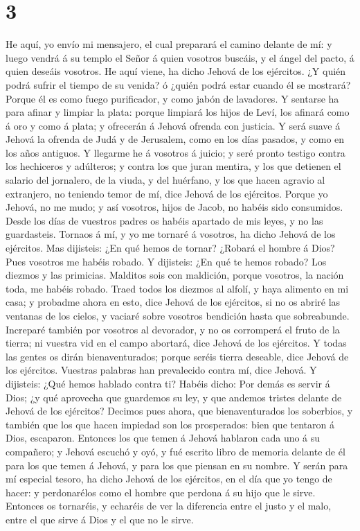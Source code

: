 \hypertarget{section-2}{%
\section{3}\label{section-2}}

 He aquí, yo envío mi mensajero, el cual preparará el camino
delante de mí: y luego vendrá á su templo el Señor á quien vosotros
buscáis, y el ángel del pacto, á quien deseáis vosotros. He aquí viene,
ha dicho Jehová de los ejércitos.  ¿Y quién podrá sufrir el
tiempo de su venida? ó ¿quién podrá estar cuando él se mostrará? Porque
él es como fuego purificador, y como jabón de lavadores.  Y
sentarse ha para afinar y limpiar la plata: porque limpiará los hijos de
Leví, los afinará como á oro y como á plata; y ofrecerán á Jehová
ofrenda con justicia.  Y será suave á Jehová la ofrenda de
Judá y de Jerusalem, como en los días pasados, y como en los años
antiguos.  Y llegarme he á vosotros á juicio; y seré pronto
testigo contra los hechiceros y adúlteros; y contra los que juran
mentira, y los que detienen el salario del jornalero, de la viuda, y del
huérfano, y los que hacen agravio al extranjero, no teniendo temor de
mí, dice Jehová de los ejércitos.  Porque yo Jehová, no me
mudo; y así vosotros, hijos de Jacob, no habéis sido consumidos.
 Desde los días de vuestros padres os habéis apartado de mis
leyes, y no las guardasteis. Tornaos á mí, y yo me tornaré á vosotros,
ha dicho Jehová de los ejércitos. Mas dijisteis: ¿En qué hemos de
tornar?  ¿Robará el hombre á Dios? Pues vosotros me habéis
robado. Y dijisteis: ¿En qué te hemos robado? Los diezmos y las
primicias.  Malditos sois con maldición, porque vosotros, la
nación toda, me habéis robado.  Traed todos los diezmos al
alfolí, y haya alimento en mi casa; y probadme ahora en esto, dice
Jehová de los ejércitos, si no os abriré las ventanas de los cielos, y
vaciaré sobre vosotros bendición hasta que sobreabunde. 
Increparé también por vosotros al devorador, y no os corromperá el fruto
de la tierra; ni vuestra vid en el campo abortará, dice Jehová de los
ejércitos.  Y todas las gentes os dirán bienaventurados;
porque seréis tierra deseable, dice Jehová de los ejércitos.
 Vuestras palabras han prevalecido contra mí, dice Jehová.
Y dijisteis: ¿Qué hemos hablado contra ti?  Habéis dicho:
Por demás es servir á Dios; ¿y qué aprovecha que guardemos su ley, y que
andemos tristes delante de Jehová de los ejércitos? 
Decimos pues ahora, que bienaventurados los soberbios, y también que los
que hacen impiedad son los prosperados: bien que tentaron á Dios,
escaparon.  Entonces los que temen á Jehová hablaron cada
uno á su compañero; y Jehová escuchó y oyó, y fué escrito libro de
memoria delante de él para los que temen á Jehová, y para los que
piensan en su nombre.  Y serán para mí especial tesoro, ha
dicho Jehová de los ejércitos, en el día que yo tengo de hacer: y
perdonarélos como el hombre que perdona á su hijo que le sirve.
 Entonces os tornaréis, y echaréis de ver la diferencia
entre el justo y el malo, entre el que sirve á Dios y el que no le
sirve.

